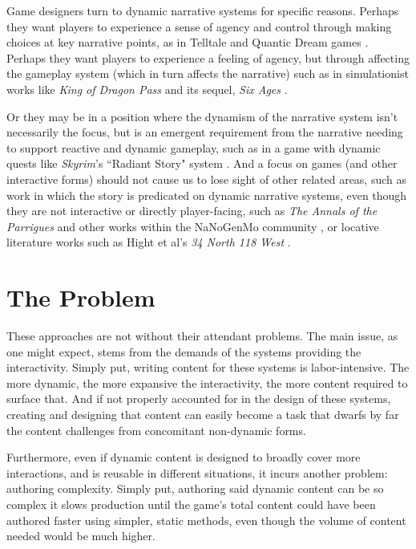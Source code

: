 Game designers turn to dynamic narrative systems for specific reasons. Perhaps they want players to experience a sense of agency and control through making choices at key narrative points, as in Telltale \cite{telltale} and Quantic Dream games \cite{quantic}. Perhaps they want players to experience a feeling of agency, but through affecting the gameplay system (which in turn affects the narrative) such as in simulationist works like \textit{King of Dragon Pass} and its sequel, \textit{Six Ages} \cite{dunham}.

Or they may be in a position where the dynamism of the narrative system isn't necessarily the focus, but is an emergent requirement from the narrative needing to support reactive and dynamic gameplay, such as in a game with dynamic quests like \textit{Skyrim}'s ``Radiant Story" system \cite{bertz_2011}. And a focus on games (and other interactive forms) should not cause us to lose sight of other related areas, such as work in which the story is predicated on dynamic narrative systems, even though they are not interactive or directly player-facing, such as \textit{The Annals of the Parrigues} \cite{short_2015} and other works within the NaNoGenMo community \cite{kazemi}, or locative literature works such as Hight et al's \textit{34 North 118 West} \cite{hight_knowlton_spellman}.

\section*{The Problem}

These approaches are not without their attendant problems. The main issue, as one might expect, stems from the demands of the systems providing the interactivity. Simply put, writing content for these systems is labor-intensive. The more dynamic, the more expansive the interactivity, the more content required to surface that. And if not properly accounted for in the design of these systems, creating and designing that content can easily become a task that dwarfs by far the content challenges from concomitant non-dynamic forms.

Furthermore, even if dynamic content is designed to broadly cover more interactions, and is reusable in different situations, it incurs another problem: authoring complexity. Simply put, authoring said dynamic content can be so complex it slows production until the game's total content could have been authored faster using simpler, static methods, even though the volume of content needed would be much higher.

